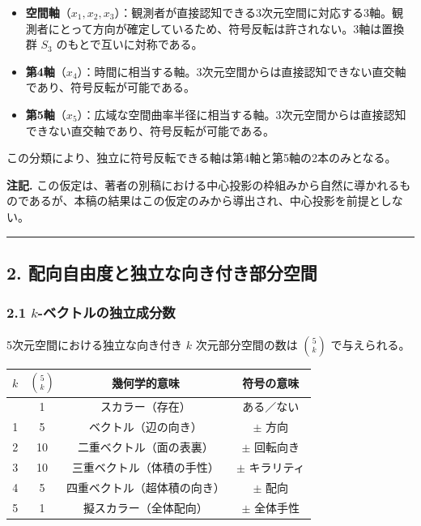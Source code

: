 \documentclass[a4paper,11pt]{ltjsarticle}
\providecommand{\tightlist}{\setlength{\itemsep}{0pt}\setlength{\parskip}{0pt}}
\newcounter{none}
\begin{document}
\begin{itemize}
\tightlist
\item
  \textbf{空間軸}（$x_1, x_2, x_3$）：観測者が直接認知できる3次元空間に対応する3軸。観測者にとって方向が確定しているため、符号反転は許されない。3軸は置換群 $S_3$ のもとで互いに対称である。
\item
  \textbf{第4軸}（$x_4$）：時間に相当する軸。3次元空間からは直接認知できない直交軸であり、符号反転が可能である。
\item
  \textbf{第5軸}（$x_5$）：広域な空間曲率半径に相当する軸。3次元空間からは直接認知できない直交軸であり、符号反転が可能である。
\end{itemize}

この分類により、独立に符号反転できる軸は第4軸と第5軸の2本のみとなる。

\textbf{注記.} この仮定は、著者の別稿における中心投影の枠組みから自然に導かれるものであるが、本稿の結果はこの仮定のみから導出され、中心投影を前提としない。

\begin{center}\rule{0.5\linewidth}{0.5pt}\end{center}

\subsection*{2. 配向自由度と独立な向き付き部分空間}

\subsubsection*{2.1 $k$-ベクトルの独立成分数}

5次元空間における独立な向き付き $k$ 次元部分空間の数は
$\binom{5}{k}$ で与えられる。

{\def\LTcaptype{none}
\begin{longtable}[]{@{}cccc@{}}
\toprule
$k$ & $\binom{5}{k}$ & 幾何学的意味 & 符号の意味 \\
\midrule
\endhead
\bottomrule
\endlastfoot
0 & 1 & スカラー（存在） & ある／ない \\
1 & 5 & ベクトル（辺の向き） & $\pm$ 方向 \\
2 & 10 & 二重ベクトル（面の表裏） & $\pm$ 回転向き \\
3 & 10 & 三重ベクトル（体積の手性） & $\pm$ キラリティ \\
4 & 5 & 四重ベクトル（超体積の向き） & $\pm$ 配向 \\
5 & 1 & 擬スカラー（全体配向） & $\pm$ 全体手性 \\
\end{longtable}
}
\end{document}
